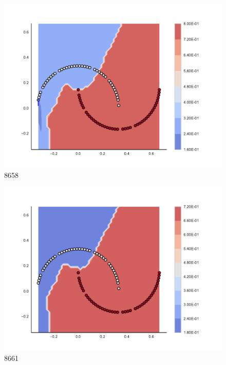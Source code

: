 \begin{subfigure}[b]{0.09\textwidth}
    \includegraphics[clip, trim=2.35cm 1.75cm 4.5cm 0cm,width=\textwidth]{img/convergence/8658.pdf}
    \caption{8658}
    \label{fig:convergence_8658}
\end{subfigure}
%
\begin{subfigure}[b]{0.09\textwidth}
    \includegraphics[clip, trim=2.35cm 1.75cm 4.5cm 0cm,width=\textwidth]{img/convergence/8661.pdf}
    \caption{8661}
    \label{fig:convergence_8661}
\end{subfigure}
%
